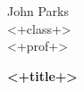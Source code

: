 \documentclass[11pt, letterpaper, notitlepage]{article}
\begin{document}
\noindent
John Parks\\
<+class+>\\
<+prof+>

\begin{center}
{\Large \textbf{<+title+>}} 
\end{center}
\end{document}
